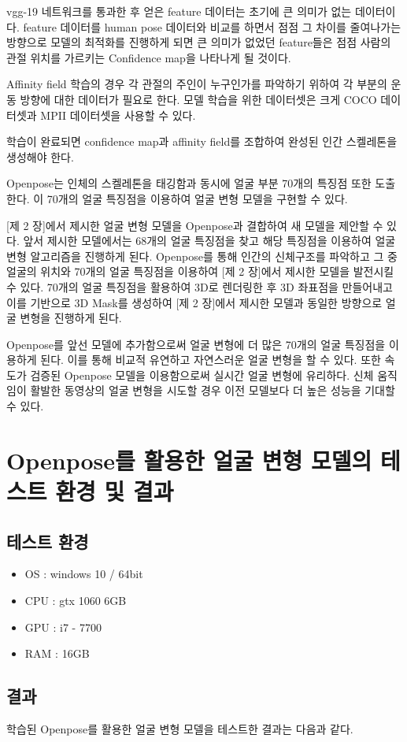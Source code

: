 \documentclass{oblivoir}
\newcommand{\spec}{
\begin{itemize}
    \item OS : windows 10 / 64bit
    \item CPU : gtx 1060 6GB
    \item GPU : i7 - 7700
    \item RAM : 16GB
\end{itemize}
}
\begin{document}
vgg-19 네트워크를 통과한 후 얻은 feature 데이터는 초기에 큰 의미가 없는 데이터이다. feature 데이터를 human pose 데이터와 비교를 하면서 점점 그 차이를 줄여나가는 방향으로 모델의 최적화를 진행하게 되면 큰 의미가 없었던 feature들은 점점 사람의 관절 위치를 가르키는 Confidence map을 나타나게 될 것이다.

Affinity field 학습의 경우 각 관절의 주인이 누구인가를 파악하기 위하여 각 부분의 운동 방향에 대한 데이터가 필요로 한다. 모델 학습을 위한 데이터셋은 크게 COCO 데이터셋과 MPII 데이터셋을 사용할 수 있다.

학습이 완료되면 confidence map과 affinity field를 조합하여 완성된 인간 스켈레톤을 생성해야 한다.

Openpose는 인체의 스켈레톤을 태깅함과 동시에 얼굴 부분 70개의 특징점 또한 도출 한다. 이 70개의 얼굴 특징점을 이용하여 얼굴 변형 모델을 구현할 수 있다.

[제 2 장]에서 제시한 얼굴 변형 모델을 Openpose과 결합하여 새 모델을 제안할 수 있다. 앞서 제시한 모델에서는 68개의 얼굴 특징점을 찾고 해당 특징점을 이용하여 얼굴 변형 알고리즘을 진행하게 된다. Openpose를 통해 인간의 신체구조를 파악하고 그 중 얼굴의 위치와 70개의 얼굴 특징점을 이용하여 [제 2 장]에서 제시한 모델을 발전시킬 수 있다. 70개의 얼굴 특징점을 활용하여 3D로 렌더링한 후 3D 좌표점을 만들어내고 이를 기반으로 3D Mask를 생성하여 [제 2 장]에서 제시한 모델과 동일한 방향으로 얼굴 변형을 진행하게 된다.

Openpose를 앞선 모델에 추가함으로써 얼굴 변형에 더 많은 70개의 얼굴 특징점을 이용하게 된다. 이를 통해 비교적 유연하고 자연스러운 얼굴 변형을 할 수 있다. 또한 속도가 검증된 Openpose 모델을 이용함으로써 실시간 얼굴 변형에 유리하다. 신체 움직임이 활발한 동영상의 얼굴 변형을 시도할 경우 이전 모델보다 더 높은 성능을 기대할 수 있다.

\section{Openpose를 활용한 얼굴 변형 모델의 테스트 환경 및 결과}

\subsection{테스트 환경}
\spec
\subsection{ 결과 }

학습된 Openpose를 활용한 얼굴 변형 모델을 테스트한 결과는 다음과 같다.
\end{document}
